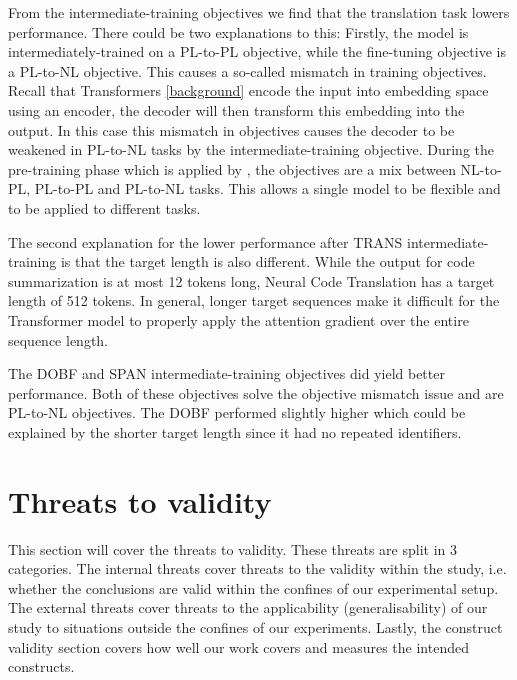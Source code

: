 From the intermediate-training objectives we find that the translation task lowers performance. There could be two explanations to this: Firstly, the model is intermediately-trained on a PL-to-PL objective, while the fine-tuning objective is a PL-to-NL objective. This causes a so-called mismatch in training objectives. Recall that Transformers \ref{background} encode the input into embedding space using an encoder, the decoder will then transform this embedding into the output. In this case this mismatch in objectives causes the decoder to be weakened in PL-to-NL tasks by the intermediate-training objective. During the pre-training phase which is applied by \citeauthor{CodeT5}, the objectives are a mix between NL-to-PL, PL-to-PL and PL-to-NL tasks. This allows a single model to be flexible and to be applied to different tasks.

The second explanation for the lower performance after TRANS intermediate-training is that the target length is also different. While the output for code summarization is at most 12 tokens long, Neural Code Translation has a target length of 512 tokens. In general, longer target sequences make it difficult for the Transformer model to properly apply the attention gradient over the entire sequence length.

The DOBF and SPAN intermediate-training objectives did yield better performance. Both of these objectives solve the objective mismatch issue and are PL-to-NL objectives.  The DOBF performed slightly higher which could be explained by the shorter target length since it had no repeated identifiers.

\section{Threats to validity}

This section will cover the threats to validity. These threats are split in 3 categories. The internal threats cover threats to the validity within the study, i.e. whether the conclusions are valid within the confines of our experimental setup. The external threats cover threats to the applicability (generalisability) of our study to situations outside the confines of our experiments. Lastly, the construct validity section covers how well our work covers and measures the intended constructs.
